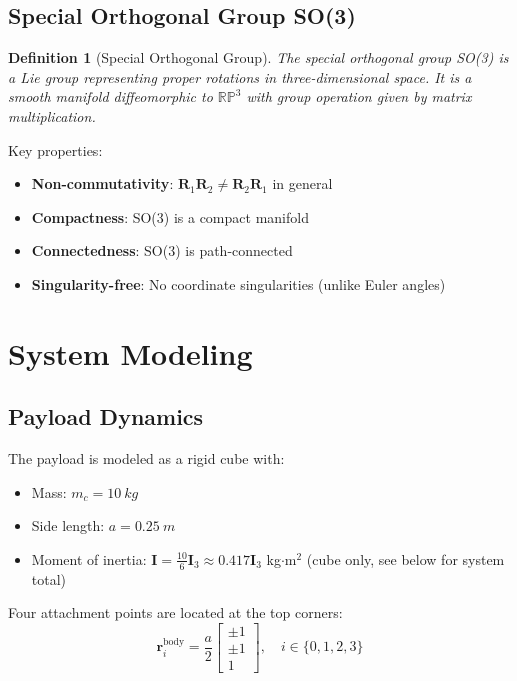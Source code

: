 \documentclass[12pt,a4paper]{article}
\newtheorem{definition}{Definition}
\begin{document}
\subsection{Special Orthogonal Group SO(3)}

\begin{definition}[Special Orthogonal Group]
The special orthogonal group SO(3) is a Lie group representing proper rotations in three-dimensional space. It is a smooth manifold diffeomorphic to $\mathbb{RP}^3$ with group operation given by matrix multiplication.
\end{definition}

Key properties:
\begin{itemize}
    \item \textbf{Non-commutativity}: $\mathbf{R}_1\mathbf{R}_2 \neq \mathbf{R}_2\mathbf{R}_1$ in general
    \item \textbf{Compactness}: SO(3) is a compact manifold
    \item \textbf{Connectedness}: SO(3) is path-connected
    \item \textbf{Singularity-free}: No coordinate singularities (unlike Euler angles)
\end{itemize}

\section{System Modeling}
\label{sec:modeling}

\subsection{Payload Dynamics}

The payload is modeled as a rigid cube with:
\begin{itemize}
    \item Mass: $m_c = \SI{10}{kg}$
    \item Side length: $a = \SI{0.25}{m}$
    \item Moment of inertia: $\mathbf{I} = \frac{10}{6}\mathbf{I}_3 \approx 0.417\mathbf{I}_3$ kg$\cdot$m$^2$ (cube only, see below for system total)
\end{itemize}

Four attachment points are located at the top corners:
\begin{equation}
    \mathbf{r}_i^{\text{body}} = \frac{a}{2}\begin{bmatrix} \pm 1 \\ \pm 1 \\ 1 \end{bmatrix}, \quad i \in \{0,1,2,3\}
    \label{eq:attachment_local}
\end{equation}
\end{document}
